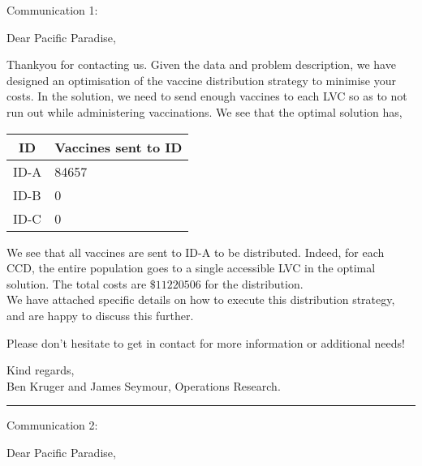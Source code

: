 \documentclass[12pt]{article}
\begin{document}
        {
        \setlength{\parindent}{0pt}
        \setlength{\parskip}{0.3cm}

        Communication 1:

        Dear Pacific Paradise,
        
        Thankyou for contacting us. Given the data and problem description, we have designed an optimisation of the vaccine distribution strategy to minimise your costs. In the solution, we need to send enough vaccines to each LVC so as to not run out while administering vaccinations. We see that the optimal solution has,
        \begin{center}
            \begin{table}[H]
                \begin{tabular}{|l|l|}
                \hline
                \multicolumn{1}{|c|}{\textbf{ID}} & \multicolumn{1}{c|}{\textbf{Vaccines sent to   ID}} \\ \hline
                ID-A                              & 84657                                               \\ \hline
                ID-B                              & 0                                                   \\ \hline
                ID-C                              & 0                                                   \\ \hline
                \end{tabular}
                \end{table}
        \end{center}
    We see that all vaccines are sent to ID-A to be distributed. Indeed, for each CCD, the entire population goes to a single accessible LVC in the optimal solution. The total costs are \(\$11220506\) for the distribution.\\
    We have attached specific details on how to execute this distribution strategy, and are happy to discuss this further.
    
    Please don't hesitate to get in contact for more information or additional needs!
    
    Kind regards,\\
    Ben Kruger and James Seymour, Operations Research.\\


    \hrule
    
    Communication 2:
    
    Dear Pacific Paradise,
        
}
\end{document}
